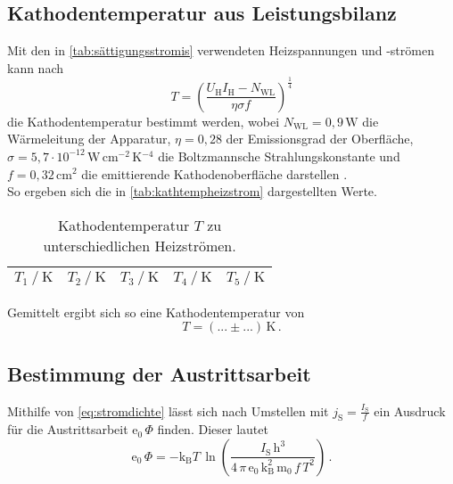 \subsection{Kathodentemperatur aus Leistungsbilanz}

Mit den in \autoref{tab:sättigungsstromis} verwendeten Heizspannungen und -strömen kann nach
\begin{equation*}
    T = \left(\dfrac{U_\text{H} I_\text{H} - N_\text{WL}}{\eta \sigma f}\right)^\frac{1}{4}
\end{equation*}
die Kathodentemperatur bestimmt werden, wobei $N_\text{WL} = 0,9 \,\unit{\watt}$ die Wärmeleitung der Apparatur, $\eta = 0,28$ der Emissionsgrad der Oberfläche,
$\sigma = 5,7 \cdot 10^{-12} \,\unit{\watt \,\centi\meter^{-2} \,\kelvin^{-4}}$ die Boltzmannsche Strahlungskonstante und $f = 0,32 \,\unit{\centi\meter^2}$ die emittierende Kathodenoberfläche darstellen \cite{ap09}. \\

So ergeben sich die in \autoref{tab:kathtempheizstrom} dargestellten Werte.

\begin{table}
    \centering
    \caption{Kathodentemperatur $T$ zu unterschiedlichen Heizströmen.}
    \label{tab:kathtempheizstrom}
    \begin{tabular}{S S S S S}
        \toprule
        {$T_1 \mathbin{/} \unit{\kelvin}$} & {$T_2 \mathbin{/} \unit{\kelvin}$} & {$T_3 \mathbin{/} \unit{\kelvin}$} & {$T_4 \mathbin{/} \unit{\kelvin}$} & {$T_5 \mathbin{/} \unit{\kelvin}$} \\
        \midrule




        \bottomrule
    \end{tabular}
\end{table}

Gemittelt ergibt sich so eine Kathodentemperatur von
\begin{equation*}
    T = (... \pm ...) \,\unit{\kelvin} \,.
\end{equation*}


\subsection{Bestimmung der Austrittsarbeit}

Mithilfe von \eqref{eq:stromdichte} lässt sich nach Umstellen mit $j_\text{S} = \frac{I_\text{S}}{f}$ ein Ausdruck für die Austrittsarbeit $\text{e}_0 \,\Phi$ finden.
Dieser lautet
\begin{equation*}
    \text{e}_0 \,\Phi = -\text{k}_\text{B} T \,\ln \left(\dfrac{I_\text{S} \, \text{h}^3}{4 \, \pi \, \text{e}_0 \, \text{k}^2_\text{B} \, \text{m}_0 \,f \,  T^2}\right) \,.
\end{equation*} \\

